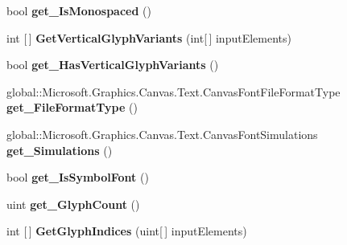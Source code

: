 \begin{DoxyCompactItemize}
bool {\bfseries get\+\_\+\+Is\+Monospaced} ()
\item 
\mbox{\label{class_microsoft_1_1_graphics_1_1_canvas_1_1_text_1_1_canvas_font_face_adb8b1652276da4c6f72b3890a611a3e6}} 
int \mbox{[}$\,$\mbox{]} {\bfseries Get\+Vertical\+Glyph\+Variants} (int\mbox{[}$\,$\mbox{]} input\+Elements)
\item 
\mbox{\label{class_microsoft_1_1_graphics_1_1_canvas_1_1_text_1_1_canvas_font_face_a8e1d6d1039882948a5a305512eb2ec10}} 
bool {\bfseries get\+\_\+\+Has\+Vertical\+Glyph\+Variants} ()
\item 
\mbox{\label{class_microsoft_1_1_graphics_1_1_canvas_1_1_text_1_1_canvas_font_face_aeab8855a726a610ea0ae9ece8c7eec26}} 
global\+::\+Microsoft.\+Graphics.\+Canvas.\+Text.\+Canvas\+Font\+File\+Format\+Type {\bfseries get\+\_\+\+File\+Format\+Type} ()
\item 
\mbox{\label{class_microsoft_1_1_graphics_1_1_canvas_1_1_text_1_1_canvas_font_face_a7bf364f1333383bc69a0842a1125fb2c}} 
global\+::\+Microsoft.\+Graphics.\+Canvas.\+Text.\+Canvas\+Font\+Simulations {\bfseries get\+\_\+\+Simulations} ()
\item 
\mbox{\label{class_microsoft_1_1_graphics_1_1_canvas_1_1_text_1_1_canvas_font_face_af9103d1b0db67fda2152dc0e75de08e1}} 
bool {\bfseries get\+\_\+\+Is\+Symbol\+Font} ()
\item 
\mbox{\label{class_microsoft_1_1_graphics_1_1_canvas_1_1_text_1_1_canvas_font_face_a6dd472c2eddd38d45da02d00fe011262}} 
uint {\bfseries get\+\_\+\+Glyph\+Count} ()
\item 
\mbox{\label{class_microsoft_1_1_graphics_1_1_canvas_1_1_text_1_1_canvas_font_face_a64925916b214b05be4dc5ea2f0f36e22}} 
int \mbox{[}$\,$\mbox{]} {\bfseries Get\+Glyph\+Indices} (uint\mbox{[}$\,$\mbox{]} input\+Elements)

\end{DoxyCompactItemize}
